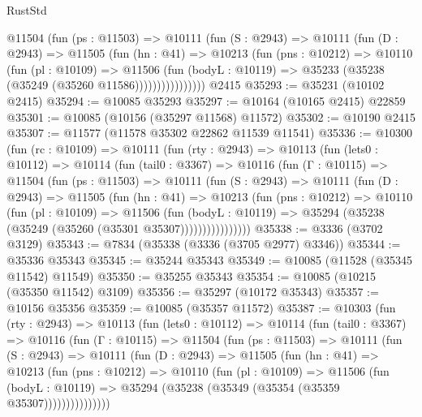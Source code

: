 \begin{lexlean}{RustStd}
\begin{coremodule}
              @11504
                (fun (ps : @11503) =>
                @10111
                  (fun (S : @2943) =>
                  @10111
                    (fun (D : @2943) =>
                    @11505
                      (fun (hn : @41) =>
                      @10213
                        (fun (pns : @10212) =>
                        @10110
                          (fun (pl : @10109) =>
                          @11506
                            (fun (bodyL : @10119) =>
                            @35233 (@35238 (@35249 (@35260 @11586))))))))))))))))
    @2415
@35293 := @35231 (@10102 @2415)
@35294 := @10085 @35293
@35297 := @10164 (@10165 @2415) @22859
@35301 := @10085 (@10156 (@35297 @11568) @11572)
@35302 := @10190 @2415
@35307 := @11577 (@11578 @35302 @22862 @11539 @11541)
@35336 := @10300
    (fun (rc : @10109) =>
    @10111
      (fun (rty : @2943) =>
      @10113
        (fun (lets0 : @10112) =>
        @10114
          (fun (tail0 : @3367) =>
          @10116
            (fun (Γ : @10115) =>
            @11504
              (fun (ps : @11503) =>
              @10111
                (fun (S : @2943) =>
                @10111
                  (fun (D : @2943) =>
                  @11505
                    (fun (hn : @41) =>
                    @10213
                      (fun (pns : @10212) =>
                      @10110
                        (fun (pl : @10109) =>
                        @11506
                          (fun (bodyL : @10119) =>
                          @35294 (@35238 (@35249 (@35260 (@35301 @35307))))))))))))))))
@35338 := @3336 (@3702 @3129)
@35343 := @7834 (@35338 (@3336 (@3705 @2977) @3346))
@35344 := @35336 @35343
@35345 := @35244 @35343
@35349 := @10085 (@11528 (@35345 @11542) @11549)
@35350 := @35255 @35343
@35354 := @10085 (@10215 (@35350 @11542) @3109)
@35356 := @35297 (@10172 @35343)
@35357 := @10156 @35356
@35359 := @10085 (@35357 @11572)
@35387 := @10303
    (fun (rty : @2943) =>
    @10113
      (fun (lets0 : @10112) =>
      @10114
        (fun (tail0 : @3367) =>
        @10116
          (fun (Γ : @10115) =>
          @11504
            (fun (ps : @11503) =>
            @10111
              (fun (S : @2943) =>
              @10111
                (fun (D : @2943) =>
                @11505
                  (fun (hn : @41) =>
                  @10213
                    (fun (pns : @10212) =>
                    @10110
                      (fun (pl : @10109) =>
                      @11506
                        (fun (bodyL : @10119) =>
                        @35294 (@35238 (@35349 (@35354 (@35359 @35307)))))))))))))))

\end{coremodule}
\end{lexlean}
